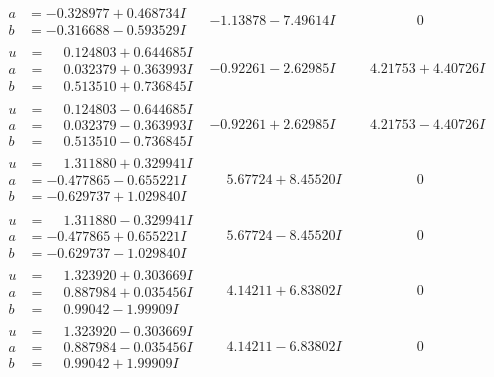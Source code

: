 \documentclass[1p]{elsarticle_modified}
\theoremstyle{definition}
\begin{document}
$$\begin{array}{c|c|c}
\begin{aligned}
a &= -0.328977 + 0.468734 I \\
b &= -0.316688 - 0.593529 I\end{aligned}
 & -1.13878 - 7.49614 I & \phantom{-0.000000 } 0 \\ \hline\begin{aligned}
u &= \phantom{-}0.124803 + 0.644685 I \\
a &= \phantom{-}0.032379 + 0.363993 I \\
b &= \phantom{-}0.513510 + 0.736845 I\end{aligned}
 & -0.92261 - 2.62985 I & \phantom{-}4.21753 + 4.40726 I \\ \hline\begin{aligned}
u &= \phantom{-}0.124803 - 0.644685 I \\
a &= \phantom{-}0.032379 - 0.363993 I \\
b &= \phantom{-}0.513510 - 0.736845 I\end{aligned}
 & -0.92261 + 2.62985 I & \phantom{-}4.21753 - 4.40726 I \\ \hline\begin{aligned}
u &= \phantom{-}1.311880 + 0.329941 I \\
a &= -0.477865 - 0.655221 I \\
b &= -0.629737 + 1.029840 I\end{aligned}
 & \phantom{-}5.67724 + 8.45520 I & \phantom{-0.000000 } 0 \\ \hline\begin{aligned}
u &= \phantom{-}1.311880 - 0.329941 I \\
a &= -0.477865 + 0.655221 I \\
b &= -0.629737 - 1.029840 I\end{aligned}
 & \phantom{-}5.67724 - 8.45520 I & \phantom{-0.000000 } 0 \\ \hline\begin{aligned}
u &= \phantom{-}1.323920 + 0.303669 I \\
a &= \phantom{-}0.887984 + 0.035456 I \\
b &= \phantom{-}0.99042 - 1.99909 I\end{aligned}
 & \phantom{-}4.14211 + 6.83802 I & \phantom{-0.000000 } 0 \\ \hline\begin{aligned}
u &= \phantom{-}1.323920 - 0.303669 I \\
a &= \phantom{-}0.887984 - 0.035456 I \\
b &= \phantom{-}0.99042 + 1.99909 I\end{aligned}
 & \phantom{-}4.14211 - 6.83802 I & \phantom{-0.000000 } 0\\

\end{array}$$
\end{document}
